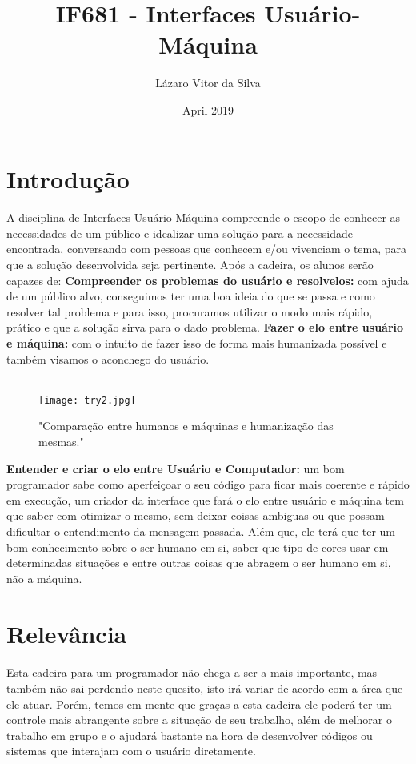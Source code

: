 \documentclass[10pt]{article}
\title{IF681 - Interfaces Usuário-Máquina}
\author{Lázaro Vitor da Silva }
\date{April 2019}
\begin{document}
\maketitle

\section{Introdução}
\paragraph{}A disciplina de Interfaces Usuário-Máquina compreende o escopo de conhecer as necessidades de um público e idealizar uma solução para a necessidade encontrada, conversando com pessoas que conhecem e/ou vivenciam o tema, para que a solução desenvolvida seja pertinente. \cite{pagina} Após a cadeira, os alunos serão capazes de:\newline
\textbf{Compreender os problemas do usuário e resolvelos:} com ajuda de um público alvo, conseguimos ter uma boa ideia do que se passa e como resolver tal problema e para isso, procuramos utilizar o modo mais rápido, prático e que a solução sirva para o dado problema.\newline
\textbf{Fazer o elo entre usuário e máquina:} com o intuito de fazer isso de forma mais humanizada possível e também visamos o aconchego do usuário.\citep{site1}
\\\\
\begin{figure}[!htb]
     \centering
     \texttt{[image: try2.jpg]}
     \caption{"Comparação entre humanos e máquinas e humanização das mesmas."}
     \label{fig:imagem1}
\end{figure}
\newpage
\textbf{Entender e criar o elo entre Usuário e Computador:} um bom programador sabe como aperfeiçoar o seu código para ficar mais coerente e rápido em execução, um criador da interface que fará o elo entre usuário e máquina tem que saber com otimizar o mesmo, sem deixar coisas ambiguas ou que possam dificultar o entendimento da mensagem passada. Além que, ele terá que ter um bom conhecimento sobre o ser humano em si, saber que tipo de cores usar em determinadas situações e entre outras coisas que abragem o ser humano em si, não a máquina.\citep{site2}
\section{Relevância}
\paragraph{}Esta cadeira para um programador não chega a ser a mais importante, mas também não sai perdendo neste quesito, isto irá variar de acordo com a área que ele atuar. Porém, temos em mente que graças a esta cadeira ele poderá ter um controle mais abrangente sobre a situação de seu trabalho, além de melhorar o trabalho em grupo e o ajudará bastante na hora de desenvolver códigos ou sistemas que interajam com o usuário diretamente.
\end{document}
